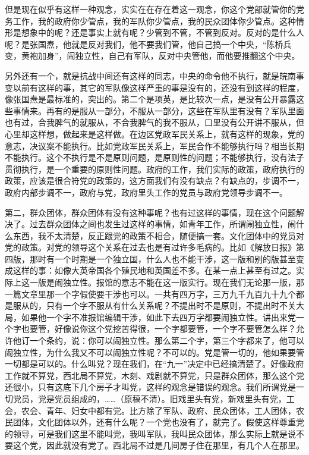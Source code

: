 但是现在似乎有这样一种观念，实实在在存在着这一观念，你这个党部就管你的党务工作，我的政府你少管点，我的军队你少管点，我的民众团体你少管点。这种情形是想象中的呢？还是事实上就有呢？少管到不管，不管到反对。反对的是什么人呢？是张国焘，他就是反对我们，他不要我们管，他自己搞一个中央，“陈桥兵变，黄袍加身”，闹独立性，自己有军队，反对中央管他，而他要推翻这个中央。

另外还有一个，就是抗战中间还有这样的同志，中央的命令他不执行，就是皖南事变以前有这样的事，其它的军队像这样严重的事是没有的，还没有到这样的程度，像张国焘是最标准的，突出的。第二个是项英，是比较次一点，是没有公开暴露这些事情来。再有的是服从一部分，不服从一部分，这些在军队里有没有？军队里面也有过，合我脾气的就服从，不合我脾气的我不服从，口里没有公开讲不服从，但心里却这样想，做起来是这样做。在边区党政军民关系上，就有这样的现象，党的意志，决议案不能执行。比如党政军民关系上，军民合作不能够执行吗？相当长期不能执行。这个不执行是不是原则问题，是原则性的问题；不能够执行，没有法子贯彻执行，是一个重要的原则性问题。政府的工作，我们实际的政策，政府执行的政策，应该是很合符党的政策的，这方面我们有没有缺点？有缺点的，步调不一，政府内部步调不一，政府与党，政府里头工作的党员与政府党领导步调不一。

第二，群众团体，群众团体有没有这种事呢？也有过这样的事情，现在这个问题解决了。过去群众团体之间也发生过这样的事情，如青年工作，所谓闹独立性，闹什么东西，我不太清楚，反正跟党的政策不相合，随便搞一套。文化团体中的党员对党的政策。对党的领导这个关系在过去也是有过许多毛病的。比如《解放日报》第四版，那时有一个时期是一个独立国，什么人也不能干涉，这一版和别的版甚至变成这样的事：如像大英帝国各个殖民地和英国差不多。在某一点上甚至有过之。实际上这一版是闹独立性。报馆的意志不能在这一版实行。现在我们无论那一版，那一篇文章里那一个字假使要干涉也可以。一共有四万字，三万九千九百九十九个都是服从的，只有一个字不服从有什么关系呢？不提出时不是原则，不提出时不关大局，如果他一个字不准报馆编辑干涉，如此下去四万字都要闹独立性。讲出来党一个字也要管，好像说你这个党挖苦得很，一个字都要管，一个字不要管怎么样？允许他订一个条约，说：你可以闹独立性。那么第二个字，第三个字都来了，他可以闹独立性，为什么我又不可以闹独立性呢？不可以的。党是管一切的，他如果要管一切都是可以的。什么叫党？现在我们，在“九一”决定中已经搞清楚了。好像政府工作就不算党，西北局不算党，木刻、戏剧就不算党，只是群众团体，那么这个党还很小，只有这底下几个房子才叫党，这样的观念是错误的观念。我们所谓党是一切党员，党是党员组成的，……（原稿不清）。旧戏里头有党，新戏里头有党，工会，农会、青年、妇女中都有党。比方除了军队、政府、民众团体，工人团体，农民团体，文化团体以外，还有什么呢？一个党也没有了，就完了。假使这样尊重党的领导，可是我们这里不能叫党，我叫军队，我叫民众团体，那么实际上就是说不要这个党，因此就没有党了。西北局不过是几间房子住在那里，有几个人在那里。

